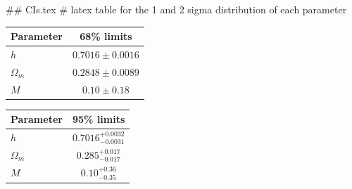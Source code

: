 ## CIs.tex
# latex table for the 1 and 2 sigma distribution of each parameter

\begin{tabular} { l  c}
 Parameter &  68\% limits\\
\hline
{\boldmath$h              $} & $0.7016\pm 0.0016          $\\
{\boldmath$\Omega_m       $} & $0.2848\pm 0.0089          $\\
{\boldmath$M              $} & $0.10\pm 0.18              $\\
\hline
\end{tabular}

\begin{tabular} { l  c}
 Parameter &  95\% limits\\
\hline
{\boldmath$h              $} & $0.7016^{+0.0032}_{-0.0031}$\\
{\boldmath$\Omega_m       $} & $0.285^{+0.017}_{-0.017}   $\\
{\boldmath$M              $} & $0.10^{+0.36}_{-0.35}      $\\
\hline
\end{tabular}
